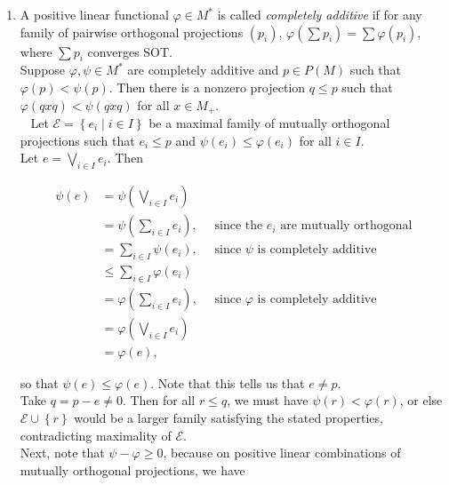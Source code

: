 \documentclass[a4paper,10pt]{report}
\begin{document}
\begin{enumerate}
\begin{proof}
  This means that there is a partial isometry $u$ with $u^*u=1$ and $uu^*=p$, so that $1=u^*(uu^*)u$ is conjugate to $p$ in $M$. If $I\subseteq M$ is a non-zero two-sided ideal, then by a previous application of the spectral theorem, %
		there is a non-zero projection $p\in I$, and consequently, $1\in I$ and $I=M$.
		
		\end{proof}
 \item 
		A positive linear functional $\varphi \in M^*$ is called \textit{completely additive} if for any family of pairwise orthogonal projections $\left( p_i \right)$, $\varphi \left( \sum p_i \right) = \sum \varphi \left( p_i \right)$, where $\sum p_i$ converges SOT.\\
		Suppose $\varphi , \psi \in M^*$ are completely additive and $p \in P \left( M \right)$ such that $\varphi \left( p \right) < \psi \left( p \right)$.  Then there is a nonzero projection $q \leq p$ such that $\varphi \left( q x q \right) < \psi \left( q x q \right)$ for all $x \in M_+$.\\\
		\proof
		Let $\mathcal E = \left\{ e_i \mid i \in I \right\}$ be a maximal family of mutually orthogonal projections such that $e_i \leq p$ and $\psi \left( e_i \right) \leq \varphi \left( e_i \right)$ for all $i \in I$.\\
		Let $e = \bigvee_{i \in I} e_i$.  Then

		\begin{align*}
				\psi \left( e \right)%
				&= \psi \left( \bigvee_{i \in I} e_i \right)\\
				&= \psi \left( \sum_{i \in I} e_i \right), \quad \text{ since the $e_i$ are mutually orthogonal}\\
				&= \sum_{i \in I} \psi \left( e_i \right), \quad \text{ since $\psi$ is completely additive}\\
				&\leq \sum_{i \in I} \varphi \left( e_i \right)\\
				&= \varphi \left( \sum_{i \in I} e_i \right), \quad \text{ since $\varphi$ is completely additive}\\
				&= \varphi \left( \bigvee_{i \in I} e_i \right)\\
				&= \varphi \left( e \right),
		\end{align*}

		so that $\psi \left( e \right) \leq \varphi \left( e \right)$.  Note that this tells us that $e \neq p$.\\
		Take $q = p - e \neq 0$.  Then for all $r \leq q$, we must have $\psi \left( r \right) < \varphi \left( r \right)$, or else $\mathcal E \cup \left\{ r \right\}$ would be a larger family satisfying the stated properties, contradicting maximality of $\mathcal E$.\\
		Next, note that $\psi - \varphi \geq 0$, because on positive linear combinations of mutually orthogonal projections, we have


\end{enumerate}
\end{document}

